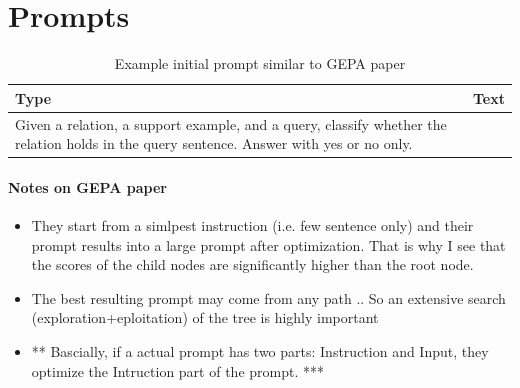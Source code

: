 \documentclass[12pt]{article}
\begin{document}
\section{Prompts}
\label{sec:prompts}

\begin{table}[h]
\centering
\begin{tabular}{ll}
\toprule
\textbf{Type} & \textbf{Text} \\
\midrule
Given a relation, a support example, and a query, classify whether the relation holds in the query sentence. Answer with yes or no only. \\
\bottomrule
\end{tabular}
\caption{Example initial prompt similar to GEPA paper}
\label{tab:example-initial-prompt}
\end{table}

\paragraph{Notes on GEPA paper}
\begin{itemize}
    \item They start from a simlpest instruction (i.e. few sentence only) and their prompt results into a large prompt after optimization.
    That is why I see that the scores of the child nodes are significantly higher than the root node.
    \item The best resulting prompt may come from any path .. So an extensive search (exploration+eploitation) of the tree is highly important
    \item ** Bascially, if a actual prompt has two parts: Instruction and Input, they optimize the Intruction part of the prompt. ***
\end{itemize}



%   
%     
\end{document}
